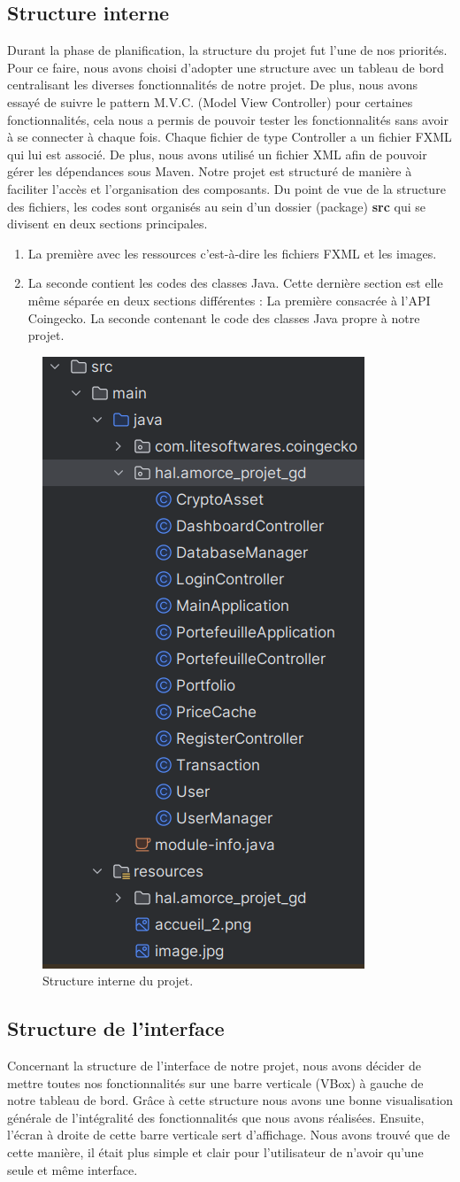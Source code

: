 \documentclass[12pt]{article}
\begin{document}
\subsection{Structure interne}
Durant la phase de planification, la structure du projet fut l'une de nos priorités. Pour ce faire, nous avons choisi d'adopter une structure avec un tableau de bord centralisant les diverses fonctionnalités de notre projet. De plus, nous avons essayé de suivre le pattern M.V.C. (Model View Controller) pour certaines fonctionnalités, cela nous a permis de pouvoir tester les fonctionnalités sans avoir à se connecter à chaque fois. Chaque fichier de type Controller a un fichier FXML qui lui est associé. De plus, nous avons utilisé un fichier XML afin de pouvoir gérer les dépendances sous Maven. Notre projet est structuré de manière à faciliter l'accès et l'organisation des composants. Du point de vue de la structure des fichiers, les codes sont organisés au sein d'un dossier (package) \textbf{src} qui se divisent en deux sections principales. \begin{enumerate}
    \item  La première avec les ressources c'est-à-dire les fichiers FXML et les images.
    \item La seconde contient les codes des classes Java. Cette dernière section est elle même séparée en deux sections différentes : La première consacrée à l'API Coingecko. La seconde contenant le code des classes Java propre à notre projet.
    \end{enumerate}

\begin{figure}[H]
    \centering
    \includegraphics[width=0.25\linewidth]{Ajout.png}
    \caption{Structure interne du projet.}
    \label{fig:enter-label}
\end{figure}

\newpage
\subsection{Structure de l'interface}
Concernant la structure de l'interface de notre projet, nous avons décider de mettre toutes nos fonctionnalités sur une barre verticale (VBox) à gauche de notre tableau de bord. Grâce à cette structure nous avons une bonne visualisation générale de l'intégralité des fonctionnalités que nous avons réalisées. Ensuite, l'écran à droite de cette barre verticale sert d'affichage. Nous avons trouvé que de cette manière, il était plus simple et clair pour l'utilisateur de n'avoir qu'une seule et même interface.\\
\end{document}
